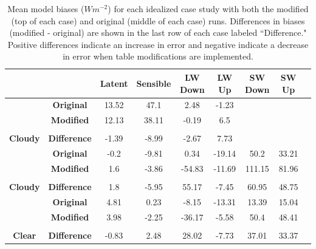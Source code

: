 \begin{table}[b!]
\centering
\footnotesize
\doublespacing
{
\begin{tabular}{| c | c | c | c | c | c | c | c | c |}
\hline
\rowcolor[HTML]{F3F3F3} & & \textbf{Latent} & \textbf{Sensible} & \textbf{LW Down} & \textbf{LW Up} & \textbf{SW Down} & \textbf{SW Up} \\
\hline 
\cellcolor[HTML]{F3F3F3}& \cellcolor[HTML]{F3F3F3} \textbf{Original} & 13.52 &	47.1	& 2.48	& -1.23 & & \\
\cellcolor[HTML]{F3F3F3} & \cellcolor[HTML]{F3F3F3} \textbf{Modified} & 12.13 & 	38.11	& -0.19	& 6.5 & & \\
\cellcolor[HTML]{F3F3F3}\multirow{-3}{*}{\shortstack{\textbf{Winter} \\ \textbf{Cloudy}}} & \cellcolor[HTML]{F3F3F3} \textbf{Difference} & -1.39 &	-8.99 &	-2.67 &	7.73 & & \\
\hline
\cellcolor[HTML]{F3F3F3} & \cellcolor[HTML]{F3F3F3} \textbf{Original} & -0.2 &	-9.81 &	0.34 &	-19.14 &	50.2 &	33.21 \\
\cellcolor[HTML]{F3F3F3} & \cellcolor[HTML]{F3F3F3} \textbf{Modified} & 1.6 &	-3.86 &	-54.83	& -11.69 &	111.15 &	81.96 \\
\cellcolor[HTML]{F3F3F3} \multirow{-3}{*}{\shortstack{\textbf{Spring} \\ \textbf{Cloudy}}} & \cellcolor[HTML]{F3F3F3} \textbf{Difference} & 1.8 &	-5.95 &	55.17	& -7.45	& 60.95 &	48.75 \\
\hline
\cellcolor[HTML]{F3F3F3} & \cellcolor[HTML]{F3F3F3} \textbf{Original} & 4.81	& 0.23	& -8.15 & 	-13.31	& 13.39	& 15.04 \\
\cellcolor[HTML]{F3F3F3} & \cellcolor[HTML]{F3F3F3} \textbf{Modified} & 3.98	& -2.25 &	-36.17 &	-5.58 &	50.4 &	48.41 \\
\cellcolor[HTML]{F3F3F3} \multirow{-3}{*}{\shortstack{\textbf{Spring} \\ \textbf{Clear}}} & \cellcolor[HTML]{F3F3F3} \textbf{Difference} \cellcolor[HTML]{F3F3F3} & -0.83 &	2.48	& 28.02	& -7.73 &	37.01	& 33.37 \\
\hline
\end{tabular}}
\caption[Mean model bias for idealized WRF runs with modified LANDUSE.TBL values.]{Mean model biases ($Wm^{-2}$) for each idealized case study with both the modified (top of each case) and original (middle of each case) runs. Differences in biases (modified - original) are shown in the last row of each case labeled ``Difference." Positive differences indicate an increase in error and negative indicate a decrease in error when table modifications are implemented.}
\label{tab:wrf:meanbias}
\end{table}

